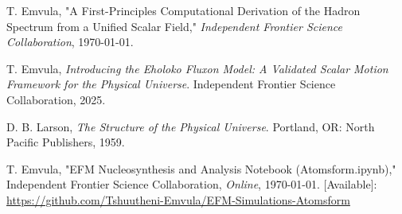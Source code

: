 \documentclass[11pt]{article}
\begin{document}

\begin{thebibliography}{99}
\raggedright

T. Emvula, "A First-Principles Computational Derivation of the Hadron Spectrum from a Unified Scalar Field," \textit{Independent Frontier Science Collaboration}, \today.

T. Emvula, \textit{Introducing the Eholoko Fluxon Model: A Validated Scalar Motion Framework for the Physical Universe}. Independent Frontier Science Collaboration, 2025.

D. B. Larson, \textit{The Structure of the Physical Universe}. Portland, OR: North Pacific Publishers, 1959.

T. Emvula, "EFM Nucleosynthesis and Analysis Notebook (Atomsform.ipynb)," Independent Frontier Science Collaboration, \textit{Online}, \today. [Available]: \url{https://github.com/Tshuutheni-Emvula/EFM-Simulations-Atomsform}

\end{thebibliography}
\end{document}

